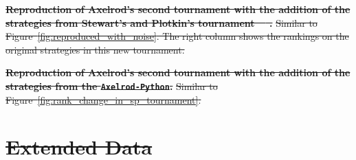 \documentclass{article}
\newcommand{\TFT}{\emph{TFT}}
\newcommand{\AXL}{\texttt{Axelrod-Python}}
\providecommand{\DIFdeltex}[1]{{\protect\color{red}\sout{#1}}}                      %
\providecommand{\DIFdelbegin}{} %
\providecommand{\DIFdelend}{} %
\providecommand{\DIFdelFL}[1]{\DIFdel{#1}} %
\providecommand{\DIFdel}[1]{\texorpdfstring{\DIFdeltex{#1}}{}} %
\newcommand{\DIFscaledelfig}{0.5}
\newlength{\DIFdelgraphicswidth} %
\newlength{\DIFdelgraphicsheight} %
\newcommand{\DIFdelincludegraphics}[2][]{%
\sbox{\DIFdelgraphicsbox}{\DIFOincludegraphics[#1]{#2}}%
\settoboxwidth{\DIFdelgraphicswidth}{\DIFdelgraphicsbox} %
\settoboxtotalheight{\DIFdelgraphicsheight}{\DIFdelgraphicsbox} %
\scalebox{\DIFscaledelfig}{%
\parbox[b]{\DIFdelgraphicswidth}{\usebox{\DIFdelgraphicsbox}\\[-\baselineskip] \rule{\DIFdelgraphicswidth}{0em}}\llap{\resizebox{\DIFdelgraphicswidth}{\DIFdelgraphicsheight}{%
\setlength{\unitlength}{\DIFdelgraphicswidth}%
\begin{picture}(1,1)%
\thicklines\linethickness{2pt} %
{\color[rgb]{1,0,0}\put(0,0){\framebox(1,1){}}}%
{\color[rgb]{1,0,0}\put(0,0){\line( 1,1){1}}}%
{\color[rgb]{1,0,0}\put(0,1){\line(1,-1){1}}}%
\end{picture}%
}\hspace*{3pt}}} %
} %
\DeclareRobustCommand{\DIFdelbegin}{\DIFOdelbegin \let\includegraphics\DIFdelincludegraphics} %
\DeclareRobustCommand{\DIFdelend}{\DIFOaddend \let\includegraphics\DIFOincludegraphics} %
\begin{document}
{%
\textbf{\DIFdelFL{Reproduction of Axelrod's second tournament with the addition
    of the strategies from Stewart's and Plotkin's tournament~\mbox{%
\cite{Stewart2012}}\hskip0pt%
.}}
\DIFdelFL{Similar to Figure~\ref{fig:reproduced_with_noise}. The right column shows the
    rankings on the original strategies in this new tournament.}}

{%
\textbf{\DIFdelFL{Reproduction of Axelrod's second tournament with the addition
    of the strategies from the \AXL.}}
\DIFdelFL{Similar to Figure~\ref{fig:rank_change_in_sp_tournament}.}}

\DIFdelend \newpage




\DIFdelbegin \section*{\DIFdel{Extended Data}}

\end{document}
